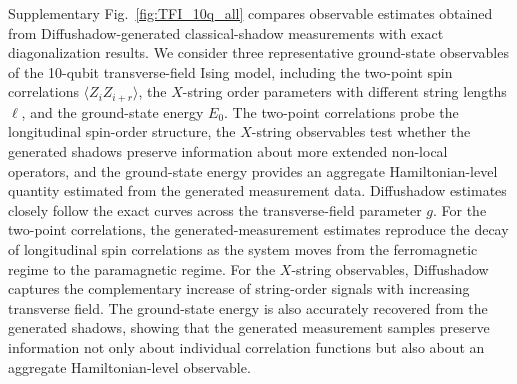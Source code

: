 \documentclass[11pt]{article}
\begin{document}
Supplementary Fig.~\ref{fig:TFI_10q_all} compares observable estimates obtained from Diffushadow-generated classical-shadow measurements with exact diagonalization results. We consider three representative ground-state observables of the 10-qubit transverse-field Ising model, including the two-point spin correlations \(\langle Z_i Z_{i+r}\rangle\), the \(X\)-string order parameters with different string lengths \(\ell\), and the ground-state energy \(E_0\). The two-point correlations probe the longitudinal spin-order structure, the \(X\)-string observables test whether the generated shadows preserve information about more extended non-local operators, and the ground-state energy provides an aggregate Hamiltonian-level quantity estimated from the generated measurement data. 
Diffushadow estimates closely follow the exact curves across the transverse-field parameter \(g\). For the two-point correlations, the generated-measurement estimates reproduce the decay of longitudinal spin correlations as the system moves from the ferromagnetic regime to the paramagnetic regime. For the \(X\)-string observables, Diffushadow captures the complementary increase of string-order signals with increasing transverse field. The ground-state energy is also accurately recovered from the generated shadows, showing that the generated measurement samples preserve information not only about individual correlation functions but also about an aggregate Hamiltonian-level observable.
\end{document}

